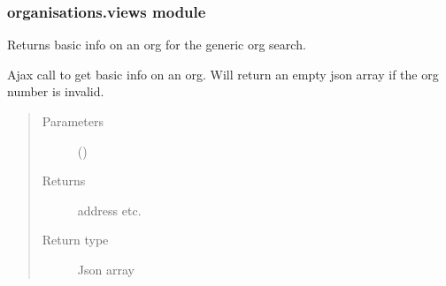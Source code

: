 \documentclass[letterpaper,10pt,english]{sphinxmanual}
\begin{document}
\subsubsection{organisations.views module}
\label{\detokenize{organisations:module-organisations.views}}\label{\detokenize{organisations:organisations-views-module}}

\begin{fulllineitems}
\label{\detokenize{organisations:organisations.views.org_detail_ajax}}
Returns basic info on an org for the generic org search.

Ajax call to get basic info on an org. Will return an empty json array
if the org number is invalid.
\begin{quote}\begin{description}
\item[{Parameters}] \leavevmode
{} () \textendash{} 

\item[{Returns}] \leavevmode
address etc.

\item[{Return type}] \leavevmode
Json array

\end{description}\end{quote}

\end{fulllineitems}

\end{document}
